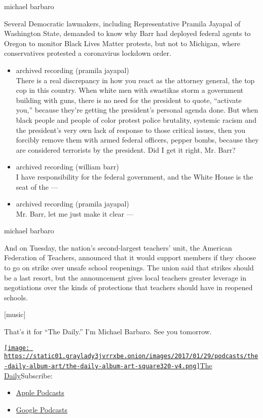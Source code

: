 michael barbaro

Several Democratic lawmakers, including Representative Pramila Jayapal
of Washington State, demanded to know why Barr had deployed federal
agents to Oregon to monitor Black Lives Matter protests, but not to
Michigan, where conservatives protested a coronavirus lockdown order.

\begin{itemize}
\item
  archived recording (pramila jayapal)\\
  There is a real discrepancy in how you react as the attorney general,
  the top cop in this country. When white men with swastikas storm a
  government building with guns, there is no need for the president to
  quote, ``activate you,'' because they're getting the president's
  personal agenda done. But when black people and people of color
  protest police brutality, systemic racism and the president's very own
  lack of response to those critical issues, then you forcibly remove
  them with armed federal officers, pepper bombs, because they are
  considered terrorists by the president. Did I get it right, Mr. Barr?
\item
  archived recording (william barr)\\
  I have responsibility for the federal government, and the White House
  is the seat of the ---
\item
  archived recording (pramila jayapal)\\
  Mr. Barr, let me just make it clear ---
\end{itemize}

michael barbaro

And on Tuesday, the nation's second-largest teachers' unit, the American
Federation of Teachers, announced that it would support members if they
choose to go on strike over unsafe school reopenings. The union said
that strikes should be a last resort, but the announcement gives local
teachers greater leverage in negotiations over the kinds of protections
that teachers should have in reopened schools.

{[}music{]}

That's it for ``The Daily.'' I'm Michael Barbaro. See you tomorrow.

\href{https://www.nytimes3xbfgragh.onion/column/the-daily}{\texttt{[image: https://static01.graylady3jvrrxbe.onion/images/2017/01/29/podcasts/the-daily-album-art/the-daily-album-art-square320-v4.png]}The
Daily}Subscribe:

\begin{itemize}
\tightlist
\item
  \href{https://itunes.apple.com/us/podcast/id1200361736}{Apple
  Podcasts}
\item
  \href{https://www.google.com/podcasts?feed=aHR0cHM6Ly9yc3MuYXJ0MTkuY29tL3RoZS1kYWlseQ\%3D\%3D}{Google
  Podcasts}
\end{itemize}

